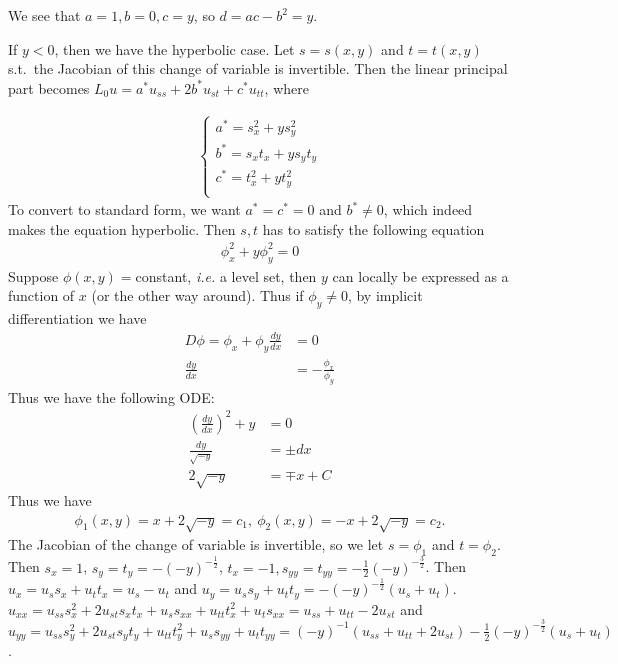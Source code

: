 \documentclass[12pt]{article}
\begin{document}
\begin{problem}[1.4.7]
We see that $ a=1,b=0,c=y$, so  $ d= ac - b^2 = y$. 
\begin{case}[1]
If $ y<0$, then we have the hyperbolic case.  Let $ s = s(x,y)$ and  $ t = t(x,y)$  s.t.\ the Jacobian of this change of variable is invertible. Then the linear principal part becomes $ L_0u = a^* u_{ss}+ 2b^* u_{st} +c^* u_{tt} $, where
\end{case}
\begin{align*}
	\begin{cases}
		a^* = s_x^2+ y s_y^2\\
		b^* = s_x t_x + y s_yt_y \\
		c^* = t_x^2+yt_y^2 \\
	\end{cases}
\end{align*}
To convert to standard form, we want $ a^* =c^* =0$ and $ b^* \neq 0$, which indeed makes the equation hyperbolic. Then $ s,t$ has to satisfy the following equation
 \begin{align*}
	\phi_x^2 + y \phi_y^2 =0
\end{align*}
Suppose $ \phi(x,y)=$constant, \emph{i.e.} a level set, then $ y$ can locally be expressed as a function of  $ x$ (or the other way around).  Thus if $ \phi_y \neq 0$, by implicit differentiation we have
\begin{align*}
	D\phi = \phi_x + \phi_y \frac{d y}{d x} &= 0 \\
	\frac{d y}{d x} &= - \frac{\phi_x}{ \phi_y} 
\end{align*}
Thus we have the following ODE:
\begin{align*}
	\left( \frac{d y}{d x}  \right) ^2+y &= 0 \\
\frac{dy}{ \sqrt{-y} }&= \pm dx \\
2\sqrt{-y}  &= \mp x +C 
\end{align*}
Thus we have
\begin{align*}
	\phi_1(x,y) = x + 2\sqrt{-y} = c_1 , \ \phi_2(x,y) = - x + 2\sqrt{-y} = c_2. 
\end{align*}
The Jacobian of the change of variable is invertible, so we let $ s=\phi_1$ and $ t = \phi_2$. Then $ s_x =1$, $ s_y = t_y = -(-y) ^{-\frac{1}{2}}$, $ t_x = -1, s_{yy} = t_{yy} = -\frac{1}{2} (-y)^{-\frac{3}{2}} $. Then $ u_x = u_s s_x + u_t t_x = u_s - u_t$ and $ u_y = u_s s_y + u_t t_y = - (-y)^{-\frac{1}{2}}(u_s + u_t)$. $ u_{x x} = u_{ss} s_x^2 +2u_{st} s_xt_x +u_s s_{xx} + u_{tt}t_x^2 +u_ts_{x x} =  u_{ss}+u_{tt}-2u_{st}$ and $ u_{yy} = u_{ss}s_y^2+2u_{st}s_yt_y + u_{tt}t_y^2 + u_s s_{yy} + u_t t_{yy} =(-y)^{-1} (u_{ss} +u_{tt}+2u_{st}) - \frac{1}{2} (-y)^{-\frac{3}{2}}(u_s + u_t)$.

\end{problem}
\end{document}

